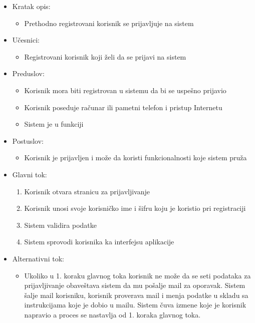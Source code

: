 \documentclass[a4paper]{article}
\begin{document}
\begin{itemize}
    \item Kratak opis:
        \begin{itemize}
            \item Prethodno registrovani korisnik se prijavljuje na sistem
        \end{itemize}
    \item Učesnici:
        \begin{itemize}
            \item Registrovani korisnik koji želi da se prijavi na sistem
        \end{itemize}
    \item Preduslov:
        \begin{itemize}
            \item Korisnik mora biti registrovan u sistemu da bi se uspešno prijavio
            \item Korisnik poseduje računar ili pametni telefon i pristup Internetu
            \item Sistem je u funkciji
        \end{itemize}
    \item Postuslov:
        \begin{itemize}
            \item Korisnik je prijavljen i može da koristi funkcionalnosti koje sistem pruža
        \end{itemize}
    \item Glavni tok:
        \begin{enumerate}
            \item Korisnik otvara stranicu za prijavljivanje
            \item Korisnik unosi svoje korisničko ime i šifru koju je koristio pri registraciji
            \item Sistem validira podatke
            \item Sistem sprovodi korisnika ka interfejsu aplikacije
        \end{enumerate}
    \item Alternativni tok:
        \begin{itemize}
            \item Ukoliko u 1. koraku glavnog toka korisnik ne može da se seti podataka za prijavljivanje obaveštava sistem da mu pošalje mail za oporavak. Sistem šalje mail korisniku, korisnik proverava mail i menja podatke u skladu sa instrukcijama koje je dobio u mailu. Sistem čuva izmene koje je korisnik napravio a proces se nastavlja od 1. koraka glavnog toka.

\end{itemize}
\end{itemize}
\end{document}
